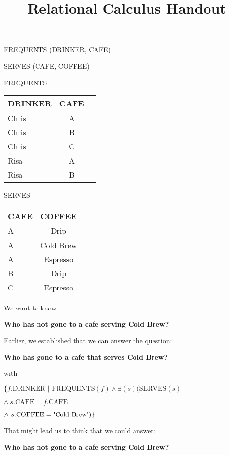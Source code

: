 \documentclass{article}
\title{Relational Calculus Handout}
\date{}
\begin{document}
\maketitle
\thispagestyle{fancy}

FREQUENTS (DRINKER, CAFE)

SERVES (CAFE, COFFEE)


FREQUENTS\\
\begin{tabular}{|l|c|c| }  \hline
\textrm{DRINKER} & \textrm{CAFE}\\ \hline
Chris & A \\ \hline
Chris & B\\ \hline
Chris & C  \\ \hline
Risa & A \\ \hline
Risa & B \\ \hline
\end{tabular}


SERVES\\
\begin{tabular}{|l|c|c| }  \hline
\textrm{CAFE} & \textrm{COFFEE}\\ \hline
A & Drip\\ \hline
A & Cold Brew \\ \hline
A &  Espresso \\ \hline
B & Drip \\ \hline
C & Espresso \\ \hline
\end{tabular}


We want to know:

\textbf{Who has not gone to a cafe serving Cold Brew?}

Earlier, we established that we can answer the question:

\textbf{Who has gone to a cafe that serves Cold Brew?}

with 

$\{f.\textrm{DRINKER } | \textrm{ FREQUENTS}(f) \wedge \exists(s)(\textrm{SERVES}(s)   $

\hspace{2em} $\wedge\ s.\textrm{CAFE} = f.\textrm{CAFE}$

\hspace{2em} $\wedge\ s.\textrm{COFFEE} = \textrm{\textquotesingle{Cold} Brew\textquotesingle}) \}$

	
That might lead us to think that we could answer:

\textbf{Who has not gone to a cafe serving Cold Brew?}
\end{document}
